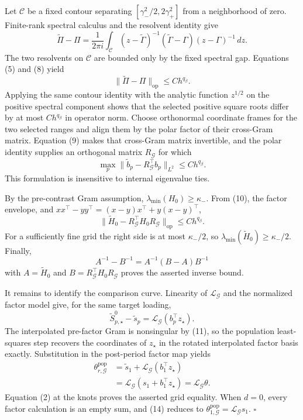 Let \(\mathscr C\) be a fixed contour separating
\([\gamma_-^2/2,2\gamma_+^2]\) from a neighborhood of zero.  Finite-rank
spectral calculus and the resolvent identity give
\[
 \widetilde\Pi-\Pi
 =\frac{1}{2\pi i}\int_{\mathscr C}
 (z-\widetilde\Gamma)^{-1}(\widetilde\Gamma-\Gamma)
 (z-\Gamma)^{-1}\,dz.                                      \tag{8}
\]
The two resolvents on \(\mathscr C\) are bounded only by the fixed spectral
gap.  Equations (5) and (8) yield
\[
 \|\widetilde\Pi-\Pi\|_{\mathrm{op}}\le Ch^{q_\beta}.        \tag{9}
\]
Applying the same contour identity with the analytic function \(z^{1/2}\)
on the positive spectral component shows that the selected positive square
roots differ by at most \(Ch^{q_\beta}\) in operator norm.  Choose
orthonormal coordinate frames for the two selected ranges and align them
by the polar factor of their cross-Gram matrix.  Equation (9) makes that
cross-Gram matrix invertible, and the polar identity supplies an orthogonal
matrix \(R_{\mathcal G}\) for which
\[
 \max_p\|\widetilde b_p-R_{\mathcal G}^{\top}b_p\|_{L^2}
 \le Ch^{q_\beta}.                                         \tag{10}
\]
This formulation is insensitive to internal eigenvalue ties.

By the pre-contrast Gram assumption,
\(\lambda_{\min}(H_0)\ge\kappa_-\).  From (10), the factor envelope, and
\(xx^\top-yy^\top=(x-y)x^\top+y(x-y)^\top\),
\[
 \|\widetilde H_0-R_{\mathcal G}^{\top}H_0R_{\mathcal G}\|_{\mathrm{op}}
 \le Ch^{q_\beta}.                                         \tag{11}
\]
For a sufficiently fine grid the right side is at most \(\kappa_-/2\),
so \(\lambda_{\min}(\widetilde H_0)\ge\kappa_-/2\).  Finally,
\[
 A^{-1}-B^{-1}=A^{-1}(B-A)B^{-1}                           \tag{12}
\]
with \(A=\widetilde H_0\) and
\(B=R_{\mathcal G}^{\top}H_0R_{\mathcal G}\) proves the asserted inverse
bound.

It remains to identify the comparison curve.  Linearity of
\(\mathcal L_{\mathcal G}\) and the normalized factor model give, for the
same target loading,
\[
 \widetilde S^0_{p,\star}-\widetilde s_p
 =\mathcal L_{\mathcal G}(b_p^\top z_\star).                \tag{13}
\]
The interpolated pre-factor Gram is nonsingular by (11), so the population
least-squares step recovers the coordinates of \(z_\star\) in the rotated
interpolated factor basis exactly.  Substitution in the post-period factor
map yields
\[
 \begin{split}
 \theta^{\mathrm{pop}}_{r,\mathcal G}
 &=\widetilde s_1+\mathcal L_{\mathcal G}(b_1^\top z_\star)\\
 &=\mathcal L_{\mathcal G}(s_1+b_1^\top z_\star)
 =\mathcal L_{\mathcal G}\theta.                            \tag{14}
 \end{split}
\]
Equation (2) at the knots proves the asserted grid equality.  When \(d=0\),
every factor calculation is an empty sum, and (14) reduces to
\(\theta^{\mathrm{pop}}_{1,\mathcal G}=\mathcal L_{\mathcal G}s_1\).
\(\square\)